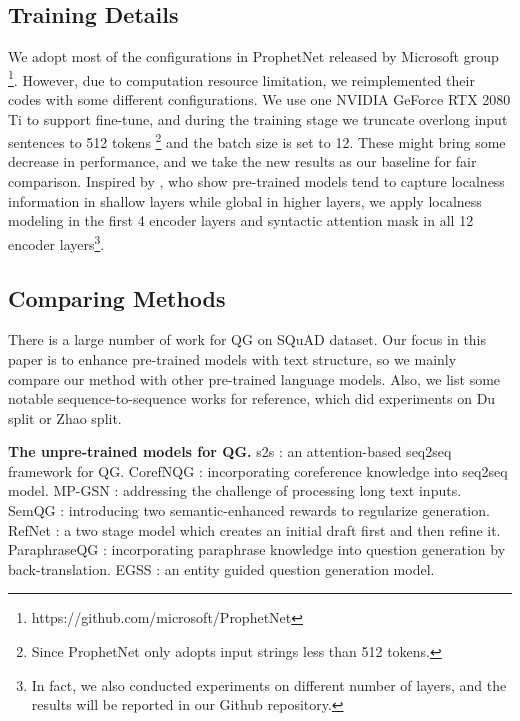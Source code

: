 \documentclass[11pt]{article}
\begin{document}
\subsection{Training Details}\label{sec-training-details}
We adopt most of the configurations in ProphetNet released by Microsoft group \footnote{\label{prophetnet-github-footnote}https://github.com/microsoft/ProphetNet}. However, due to computation resource limitation, we reimplemented their codes with some different configurations. We use one NVIDIA GeForce RTX 2080 Ti to support fine-tune, and during the training stage we truncate overlong input sentences to 512 tokens \footnote{Since ProphetNet only adopts input strings less than 512 tokens.} and the batch size is set to 12. These might bring some decrease in performance, and we take the new results as our baseline for fair comparison.
Inspired by \citet{yang-etal-2018-modeling}, who show pre-trained models tend to capture localness information in shallow layers while global in higher layers, we apply localness modeling in the first 4 encoder layers and syntactic attention mask in all 12 encoder layers\footnote{In fact, we also conducted experiments on different number of layers, and the results will be reported in our Github repository.}. 


\subsection{Comparing Methods}
There is a large number of work for QG on SQuAD dataset. Our focus in this paper is to enhance pre-trained models with text structure, so we mainly compare our method with other pre-trained language models. Also, we list some notable sequence-to-sequence works for reference, which did experiments on Du split or Zhao split.   


\textbf{The unpre-trained models for QG.} s2s \citep{du-etal-2017-learning}: an attention-based seq2seq framework for QG. CorefNQG \citep{du-cardie-2018-harvesting}: incorporating coreference knowledge into seq2seq model. MP-GSN \citep{zhao-etal-2018-paragraph}: addressing the challenge of processing long text inputs. SemQG \citep{zhang-bansal-2019-addressing}: introducing two semantic-enhanced rewards to regularize generation. RefNet \citep{nema-etal-2019-lets}: a two stage model which creates an initial draft first and then refine it. ParaphraseQG \citep{jia-etal-2020-ask}: incorporating paraphrase knowledge into question generation by back-translation. EGSS \citep{Huang_Fu_Mo_Cai_Xu_Li_Li_Leung_2021}: an entity guided question generation model.
\end{document}
